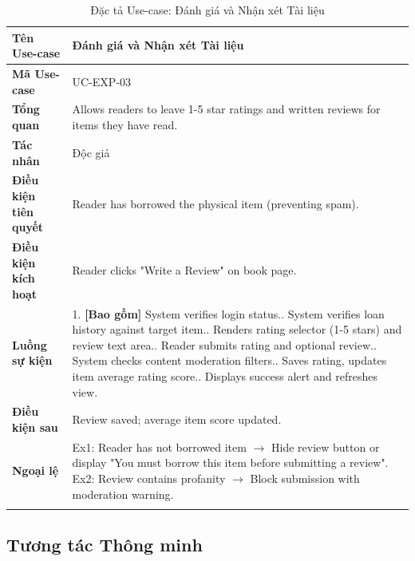 \begin{longtable}{|p{3.5cm}|p{11.5cm}|}
    \hline
    \textbf{Tên Use-case} & \textbf{Đánh giá và Nhận xét Tài liệu} \\
    \hline
    \textbf{Mã Use-case} & UC-EXP-03 \\
    \hline
    \textbf{Tổng quan} & Allows readers to leave 1-5 star ratings and written reviews for items they have read. \\
    \hline
    \textbf{Tác nhân} & Độc giả \\
    \hline
    \textbf{Điều kiện tiên quyết} & Reader has borrowed the physical item (preventing spam). \\
    \hline
    \textbf{Điều kiện kích hoạt} & Reader clicks "Write a Review" on book page. \\
    \hline
    \textbf{Luồng sự kiện} & 
    1. \textbf{[Bao gồm]} System verifies login status.\newline
    2. System verifies loan history against target item.\newline
    3. Renders rating selector (1-5 stars) and review text area.\newline
    4. Reader submits rating and optional review.\newline
    5. System checks content moderation filters.\newline
    6. Saves rating, updates item average rating score.\newline
    7. Displays success alert and refreshes view. \\
    \hline
    \textbf{Điều kiện sau} & Review saved; average item score updated. \\
    \hline
    \textbf{Ngoại lệ} & 
    Ex1: Reader has not borrowed item $\rightarrow$ Hide review button or display "You must borrow this item before submitting a review".\newline
    Ex2: Review contains profanity $\rightarrow$ Block submission with moderation warning. \\
    \hline
    \caption{Đặc tả Use-case: Đánh giá và Nhận xét Tài liệu}
\end{longtable}

\subsection{Tương tác Thông minh}

